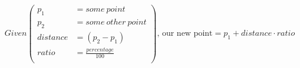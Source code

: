 \documentclass[12pt]{article}
\begin{document}
\[
Given \left (
\begin{aligned}
p_1 &= some\ point \\
p_2 &= some\ other\ point \\
distance &= (p_2 - p_1) \\
ratio &= \frac{percentage}{100} \\
\end{aligned}
\right ) \text{, our new point} = p_1 + distance \cdot ratio
\]
\end{document}
